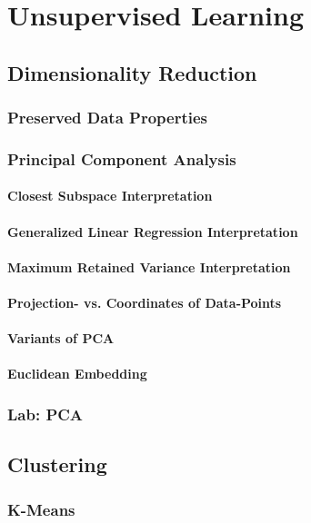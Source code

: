 \chapter{Unsupervised Learning}
    \section{Dimensionality Reduction}
        \subsection{Preserved Data Properties}
        \subsection{Principal Component Analysis}
            \subsubsection{Closest Subspace Interpretation}
            \subsubsection{Generalized Linear Regression Interpretation}
            \subsubsection{Maximum Retained Variance Interpretation}
            \subsubsection{Projection- vs. Coordinates of Data-Points}
            \subsubsection{Variants of PCA}
        \subsubsection{Euclidean Embedding}
        \subsection{Lab: PCA}
        
    \section{Clustering}
        \subsection{K-Means}
